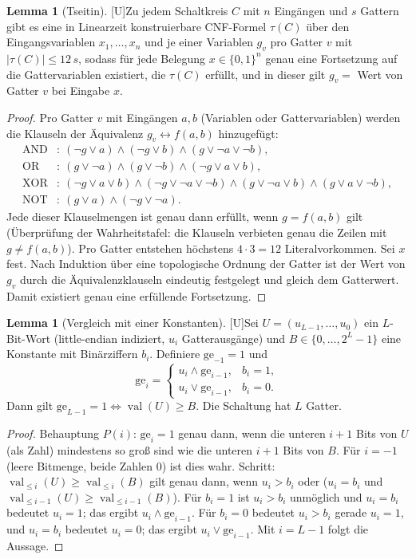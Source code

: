 \documentclass[a4paper,12pt]{article}
\theoremstyle{definition}
\newtheorem{lemma}[definition]{Lemma}
\newcommand{\tU}{\textsf{\small[U]}}   %
\newcommand{\bits}{\{0,1\}}
\newcommand{\val}{\operatorname{val}}
\begin{document}
\begin{lemma}[Tseitin]\tU\label{lem:tseitin}
Zu jedem Schaltkreis \(C\) mit \(n\) Eingängen und \(s\) Gattern gibt es eine in Linearzeit konstruierbare CNF-Formel \(\tau(C)\) über den Eingangsvariablen \(x_1,\dots,x_n\) und je einer Variablen \(g_v\) pro Gatter \(v\) mit \(|\tau(C)|\le 12\,s\), sodass für jede Belegung \(x\in\bits^n\) genau eine Fortsetzung auf die Gattervariablen existiert, die \(\tau(C)\) erfüllt, und in dieser gilt \(g_v=\) Wert von Gatter \(v\) bei Eingabe \(x\).
\end{lemma}
\begin{proof}
Pro Gatter \(v\) mit Eingängen \(a,b\) (Variablen oder Gattervariablen) werden die Klauseln der Äquivalenz \(g_v\leftrightarrow f(a,b)\) hinzugefügt:
\begin{align*}
\mathrm{AND}&:\ (\neg g\vee a)\wedge(\neg g\vee b)\wedge(g\vee\neg a\vee\neg b),\\
\mathrm{OR}&:\ (g\vee\neg a)\wedge(g\vee\neg b)\wedge(\neg g\vee a\vee b),\\
\mathrm{XOR}&:\ (\neg g\vee a\vee b)\wedge(\neg g\vee\neg a\vee\neg b)\wedge(g\vee\neg a\vee b)\wedge(g\vee a\vee\neg b),\\
\mathrm{NOT}&:\ (g\vee a)\wedge(\neg g\vee\neg a).
\end{align*}
Jede dieser Klauselmengen ist genau dann erfüllt, wenn \(g=f(a,b)\) gilt (Überprüfung der Wahrheitstafel: die Klauseln verbieten genau die Zeilen mit \(g\ne f(a,b)\)). Pro Gatter entstehen höchstens \(4\cdot3=12\) Literalvorkommen. Sei \(x\) fest. Nach Induktion über eine topologische Ordnung der Gatter ist der Wert von \(g_v\) durch die Äquivalenzklauseln eindeutig festgelegt und gleich dem Gatterwert. Damit existiert genau eine erfüllende Fortsetzung.
\end{proof}

\begin{lemma}[Vergleich mit einer Konstanten]\tU\label{lem:compare}
Sei \(U=(u_{L-1},\dots,u_0)\) ein \(L\)-Bit-Wort (little-endian indiziert, \(u_i\) Gatterausgänge) und \(B\in\{0,\dots,2^L-1\}\) eine Konstante mit Binärziffern \(b_i\). Definiere \(\mathrm{ge}_{-1}=1\) und
\[
  \mathrm{ge}_i=\begin{cases} u_i\wedge \mathrm{ge}_{i-1}, & b_i=1,\\ u_i\vee \mathrm{ge}_{i-1}, & b_i=0.\end{cases}
\]
Dann gilt \(\mathrm{ge}_{L-1}=1\iff \val(U)\ge B\). Die Schaltung hat \(L\) Gatter.
\end{lemma}
\begin{proof}
Behauptung \(P(i)\): \(\mathrm{ge}_i=1\) genau dann, wenn die unteren \(i+1\) Bits von \(U\) (als Zahl) mindestens so groß sind wie die unteren \(i+1\) Bits von \(B\). Für \(i=-1\) (leere Bitmenge, beide Zahlen 0) ist dies wahr. Schritt: \(\val_{\le i}(U)\ge \val_{\le i}(B)\) gilt genau dann, wenn \(u_i>b_i\) oder (\(u_i=b_i\) und \(\val_{\le i-1}(U)\ge\val_{\le i-1}(B)\)). Für \(b_i=1\) ist \(u_i>b_i\) unmöglich und \(u_i=b_i\) bedeutet \(u_i=1\); das ergibt \(u_i\wedge\mathrm{ge}_{i-1}\). Für \(b_i=0\) bedeutet \(u_i>b_i\) gerade \(u_i=1\), und \(u_i=b_i\) bedeutet \(u_i=0\); das ergibt \(u_i\vee\mathrm{ge}_{i-1}\). Mit \(i=L-1\) folgt die Aussage.
\end{proof}
\end{document}
